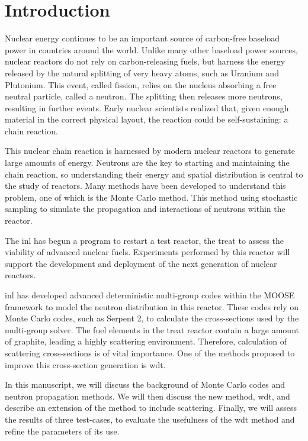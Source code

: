 
\chapter{Introduction}
\label{chap:intro}

Nuclear energy continues to be an important source of carbon-free
baseload power in countries around the world. Unlike many other
baseload power sources, nuclear reactors do not rely on
carbon-releasing fuels, but harness the energy released by the
natural splitting of very heavy atoms, such as Uranium and
Plutonium. This event, called fission, relies on the nucleus absorbing
a free neutral particle, called a neutron. The splitting then releases
more neutrons, resulting in further events. Early nuclear scientists
realized that, given enough material in the correct physical layout,
the reaction could be self-sustaining: a chain reaction.

This nuclear chain reaction is harnessed by modern nuclear reactors
to generate large amounts of energy. Neutrons are the key to starting
and maintaining the chain reaction, so understanding their energy and
spatial distribution is central to the study of reactors. Many methods
have been developed to understand this problem, one of which is the
Monte Carlo method. This method using stochastic sampling to simulate
the propagation and interactions of neutrons within the reactor.

The \gls{inl} has begun a program to restart a test reactor, the
\gls{treat} to assess the viability of advanced nuclear
fuels. Experiments performed by this reactor will
support the development and deployment of the next generation of
nuclear reactors.

\gls{inl} has developed advanced deterministic multi-group codes
within the MOOSE framework to model the neutron
distribution in this reactor. These codes rely on Monte Carlo codes,
such as Serpent 2, to calculate the cross-sections used by the
multi-group solver. The fuel elements in the \gls{treat} reactor
contain a large amount of graphite, leading a highly scattering
environment. Therefore, calculation of scattering cross-sections is of
vital importance. One of the methods proposed to improve this
cross-section generation is \gls{wdt}.

In this manuscript, we will discuss the background of Monte Carlo
codes and neutron propagation methods. We will then discuss the new
method, \gls{wdt}, and describe an extension of the method to include
scattering. Finally, we will assess the results of three test-cases,
to evaluate the usefulness of the \gls{wdt} method and refine the
parameters of its use.





